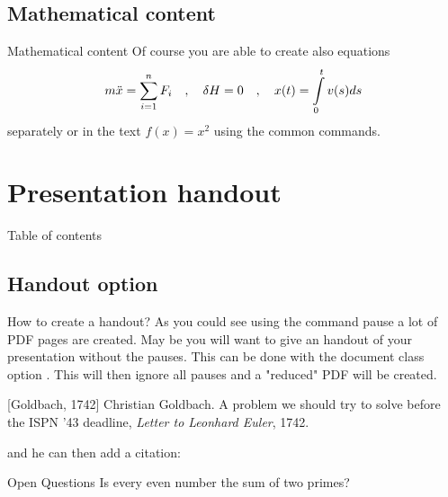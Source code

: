\documentclass{beamer}
\begin{document}
\subsection[Math]{Mathematical content}
\begin{frame}{Mathematical content}
Of course you are able to create also equations
\begin{equation}
	m \ddot{x} = \sum_{i=1}^n F_i \quad , \quad
	\delta H = 0 \quad , \quad
	x(t) = \int_0^t\limits{ v(s) }ds
\end{equation}
separately or in the text $f(x)=x^2$ using the common commands.
\end{frame}


\section[Handout]{Presentation handout}

\begin{frame}{Table of contents}
\end{frame}


\subsection{Handout option}
\begin{frame}{How to create a handout?}
As you could see using the command pause a lot of PDF pages are created. May be you will want to give an handout of your presentation without the pauses. This can be done with the document class option . This will then ignore all pauses and a "reduced" PDF will be created.
\end{frame}


\begin{frame}
 
 \begin{thebibliography}{10}
[Goldbach, 1742]
Christian Goldbach.
\newblock A problem we should try to solve before the ISPN ’43 deadline,
\newblock \emph{Letter to Leonhard Euler}, 1742.
\end{thebibliography}
and he can then add a citation:
\begin{block}{Open Questions}
Is every even number the sum of two primes?
\cite{Goldbach1742}
\end{block}
\end{frame}
\end{document}
